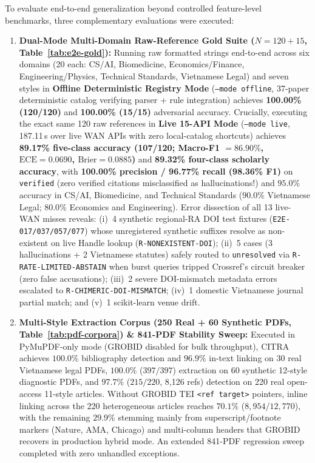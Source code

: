 To evaluate end-to-end generalization beyond controlled feature-level benchmarks, three complementary evaluations were executed:
\begin{enumerate}
    \item \textbf{Dual-Mode Multi-Domain Raw-Reference Gold Suite ($N = 120 + 15$, Table~\ref{tab:e2e-gold}):} Running raw formatted strings end-to-end across six domains (20 each: CS/AI, Biomedicine, Economics/Finance, Engineering/Physics, Technical Standards, Vietnamese Legal) and seven styles in \textbf{Offline Deterministic Registry Mode} (\texttt{--mode offline}, 37-paper deterministic catalog verifying parser + rule integration) achieves \textbf{100.00\% (120/120)} and \textbf{100.00\% (15/15)} adversarial accuracy. Crucially, executing the exact same 120 raw references in \textbf{Live 15-API Mode} (\texttt{--mode live}, 187.11\,s over live WAN APIs with zero local-catalog shortcuts) achieves \textbf{89.17\% five-class accuracy (107/120; Macro-F1 $= 86.90\%$, $\text{ECE} = 0.0690$, $\text{Brier} = 0.0885$)} and \textbf{89.32\% four-class scholarly accuracy}, with \textbf{100.00\% precision / 96.77\% recall (98.36\% F1)} on \texttt{verified} (zero verified citations misclassified as hallucinations!) and $95.0\%$ accuracy in CS/AI, Biomedicine, and Technical Standards ($90.0\%$ Vietnamese Legal; $80.0\%$ Economics and Engineering). Error dissection of all 13 live-WAN misses reveals: (i)~4 synthetic regional-RA DOI test fixtures (\texttt{E2E-017/037/057/077}) whose unregistered synthetic suffixes resolve as non-existent on live Handle lookup (\texttt{R-NONEXISTENT-DOI}); (ii)~5 cases (3 hallucinations + 2 Vietnamese statutes) safely routed to \texttt{unresolved} via \texttt{R-RATE-LIMITED-ABSTAIN} when burst queries tripped Crossref's circuit breaker (zero false accusations); (iii)~2 severe DOI-mismatch metadata errors escalated to \texttt{R-CHIMERIC-DOI-MISMATCH}; (iv)~1 domestic Vietnamese journal partial match; and (v)~1 scikit-learn venue drift.
    \item \textbf{Multi-Style Extraction Corpus (250 Real + 60 Synthetic PDFs, Table~\ref{tab:pdf-corpora}) \& 841-PDF Stability Sweep:} Executed in PyMuPDF-only mode (GROBID disabled for bulk throughput), CITRA achieves $100.0\%$ bibliography detection and $96.9\%$ in-text linking on 30 real Vietnamese legal PDFs, $100.0\%$ ($397/397$) extraction on 60 synthetic 12-style diagnostic PDFs, and $97.7\%$ ($215/220$, 8,126 refs) detection on 220 real open-access 11-style articles. Without GROBID TEI \texttt{<ref target>} pointers, inline linking across the 220 heterogeneous articles reaches $70.1\%$ ($8{,}954/12{,}770$), with the remaining $29.9\%$ stemming mainly from superscript/footnote markers (Nature, AMA, Chicago) and multi-column headers that GROBID recovers in production hybrid mode. An extended 841-PDF regression sweep completed with zero unhandled exceptions.

\end{enumerate}
